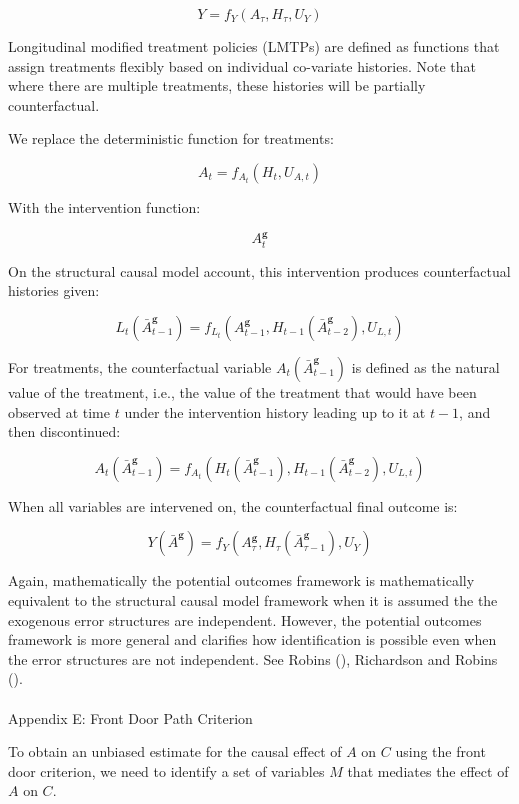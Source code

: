 \documentclass[
  single column]{article}
\makeatletter
\let\oldparagraph\paragraph
\renewcommand{\paragraph}{
    \@ifstar
      \xxxParagraphStar
      \xxxParagraphNoStar
  }
\newcommand{\xxxParagraphStar}[1]{\oldparagraph*{#1}\mbox{}}
\newcommand{\xxxParagraphNoStar}[1]{\oldparagraph{#1}\mbox{}}
\makeatother
\begin{document}
\[
Y = f_{Y}(A_{\tau}, H_{\tau}, U_{Y})
\]

Longitudinal modified treatment policies (LMTPs) are defined as
functions that assign treatments flexibly based on individual co-variate
histories. Note that where there are multiple treatments, these
histories will be partially counterfactual.

We replace the deterministic function for treatments:

\[
A_t = f_{A_t}(H_t, U_{A,t})
\]

With the intervention function:

\[
A^\mathbf{g}_t
\]

On the structural causal model account, this intervention produces
counterfactual histories given:

\[
L_t(\bar{A}^\mathbf{g}_{t-1}) = f_{L_t}(A^\mathbf{g}_{t-1}, H_{t-1}(\bar{A}^\mathbf{g}_{t-2}), U_{L,t})
\]

For treatments, the counterfactual variable
\(A_t(\bar{A}^\mathbf{g}_{t-1})\) is defined as the natural value of the
treatment, i.e., the value of the treatment that would have been
observed at time \(t\) under the intervention history leading up to it
at \(t-1\), and then discontinued:

\[
A_t(\bar{A}^\mathbf{g}_{t-1}) = f_{A_t}(H_t(\bar{A}^\mathbf{g}_{t-1}), H_{t-1}(\bar{A}^\mathbf{g}_{t-2}), U_{L,t})
\]

When all variables are intervened on, the counterfactual final outcome
is:

\[
Y(\bar{A}^\mathbf{g}) = f_Y(A^\mathbf{g}_\tau, H_\tau(\bar{A}^\mathbf{g}_{\tau-1}), U_{Y})
\]

Again, mathematically the potential outcomes framework is mathematically
equivalent to the structural causal model framework when it is assumed
the the exogenous error structures are independent. However, the
potential outcomes framework is more general and clarifies how
identification is possible even when the error structures are not
independent. See Robins (), Richardson
and Robins ().

\newpage{}

\paragraph{Appendix E: Front Door Path Criterion}\label{id-app-e}

To obtain an unbiased estimate for the causal effect of \(A\) on \(C\)
using the front door criterion, we need to identify a set of variables
\(M\) that mediates the effect of \(A\) on \(C\).
\end{document}
